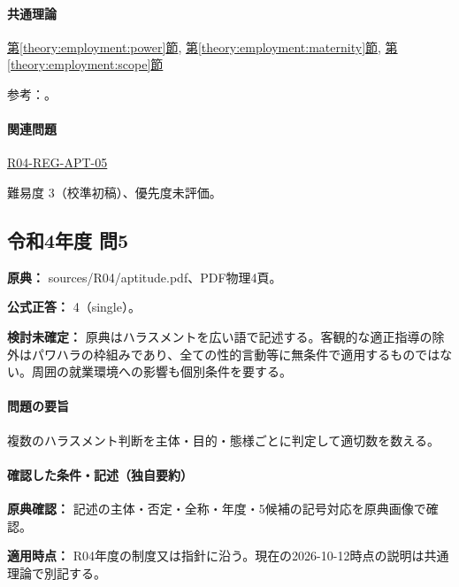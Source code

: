 \paragraph{共通理論} \hyperref[theory:employment:power]{第\ref*{theory:employment:power}節}, \hyperref[theory:employment:maternity]{第\ref*{theory:employment:maternity}節}, \hyperref[theory:employment:scope]{第\ref*{theory:employment:scope}節}

\par 参考：\cite{employment_power2012,employment_power_current,employment_sexual_current,employment_sexual2018,employment_sexual2018}。

\paragraph{関連問題} \hyperref[q:r04-reg-apt-05]{R04-REG-APT-05}

\par 難易度 3（校準初稿）、優先度未評価。

\subsection{令和4年度 問5}
\label{q:r04-reg-apt-05}

\noindent\textbf{原典：} sources/R04/aptitude.pdf、PDF物理4頁。

\textbf{公式正答：} 4（single）。

\par\textbf{検討未確定：} 原典はハラスメントを広い語で記述する。客観的な適正指導の除外はパワハラの枠組みであり、全ての性的言動等に無条件で適用するものではない。周囲の就業環境への影響も個別条件を要する。

\paragraph{問題の要旨} 複数のハラスメント判断を主体・目的・態様ごとに判定して適切数を数える。

\paragraph{確認した条件・記述（独自要約）}\mbox{}\par

\noindent\textbf{原典確認：} 記述の主体・否定・全称・年度・5候補の記号対応を原典画像で確認。\par

\noindent\textbf{適用時点：} R04年度の制度又は指針に沿う。現在の2026-10-12時点の説明は共通理論で別記する。\par

